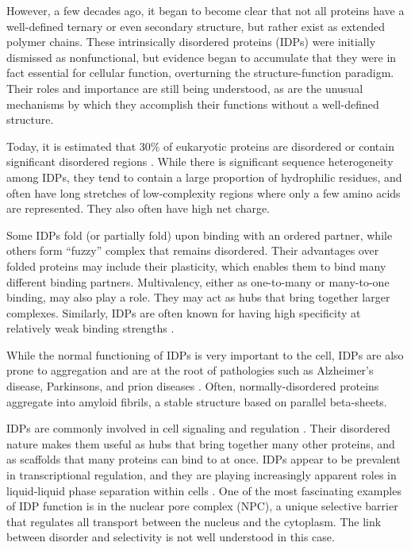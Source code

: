 However, a few decades ago, it began to become clear that not all proteins have a well-defined ternary or even secondary structure, but rather exist as extended polymer chains.  These intrinsically disordered proteins (IDPs) were initially dismissed as nonfunctional, but evidence began to accumulate that they were in fact essential for cellular function, overturning the structure-function paradigm.  Their roles and importance are still being understood, as are the unusual mechanisms by which they accomplish their functions without a well-defined structure.

Today, it is estimated that 30\% of eukaryotic proteins are disordered or contain significant disordered regions \cite{uversky13}.  While there is significant sequence heterogeneity among IDPs, they tend to contain a large proportion of hydrophilic residues, and often have long stretches of low-complexity regions where only a few amino acids are represented.  They also often have high net charge.

Some IDPs fold (or partially fold) upon binding with an ordered partner, while others form ``fuzzy'' complex that remains disordered.  Their advantages over folded proteins may include their plasticity, which enables them to bind many different binding partners.  Multivalency, either as one-to-many or many-to-one binding, may also play a role.  They may act as hubs that bring together larger complexes.  Similarly, IDPs are often known for having high specificity at relatively weak binding strengths \cite{wright15, aramburu17}.

While the normal functioning of IDPs is very important to the cell, IDPs are also prone to aggregation and are at the root of pathologies such as Alzheimer's disease, Parkinsons, and prion diseases \cite{babu11}.  Often, normally-disordered proteins aggregate into amyloid fibrils, a stable structure based on parallel beta-sheets.

IDPs are commonly involved in cell signaling and regulation \cite{wright15}.  Their disordered nature makes them useful as hubs that bring together many other proteins, and as scaffolds that many proteins can bind to at once.  IDPs appear to be prevalent in transcriptional regulation, and they are playing increasingly apparent roles in liquid-liquid phase separation within cells \cite{brangwynne15}.  One of the most fascinating examples of IDP function is in the nuclear pore complex (NPC), a unique selective barrier that regulates all transport between the nucleus and the cytoplasm.  The link between disorder and selectivity is not well understood in this case.

